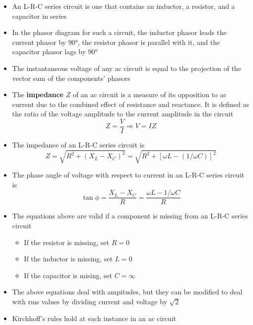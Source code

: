 \documentclass{article}
\begin{document}
\begin{itemize}
  \item An L-R-C series circuit is one that contains an inductor, a resistor, and a capacitor in series

  \item In the phasor diagram for such a circuit, the inductor phasor leads the current phasor by $\ang{90}$, the resistor phasor is parallel with it, and the capacitor phasor lags by $\ang{90}$

  \item The instantaneous voltage of any ac circuit is equal to the projection of the vector sum of the components' phasors

  \item The \textbf{impedance} $Z$ of an ac circuit is a measure of its opposition to ac current due to the combined effect of resistance and reactance. It is defined as the ratio of the voltage amplitude to the current amplitude in the circuit \[Z = \frac{V}{I} \Rightarrow V = I Z\]

  \item The impedance of an L-R-C series circuit is \[Z = \sqrt{R^2 + (X_L - X_C)^2} = \sqrt{R^2 + [\omega L - (1 / \omega C)]^2}\]

  \item The phase angle of voltage with respect to current in an L-R-C series circuit is \[\tan \phi = \frac{X_L - X_C}{R} = \frac{\omega L - 1 / \omega C}{R}\]

  \item The equations above are valid if a component is missing from an L-R-C series circuit

        \begin{itemize}
          \item If the resistor is missing, set $R = 0$

          \item If the inductor is missing, set $L = 0$

          \item If the capacitor is mising, set $C = \infty$
        \end{itemize}

  \item The above equations deal with ampitudes, but they can be modified to deal with rms values by dividing current and voltage by $\sqrt{2}$

  \item Kirchhoff's rules hold at each instance in an ac circuit
\end{itemize}
\end{document}
